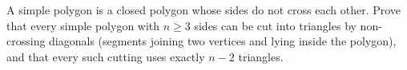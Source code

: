 A simple polygon is a closed polygon whose sides do not cross each other. Prove that every simple polygon with $n\ge3$ sides can be cut into triangles by non-crossing diagonals (segments joining two vertices and lying inside the polygon), and that every such cutting uses exactly $n-2$ triangles.
